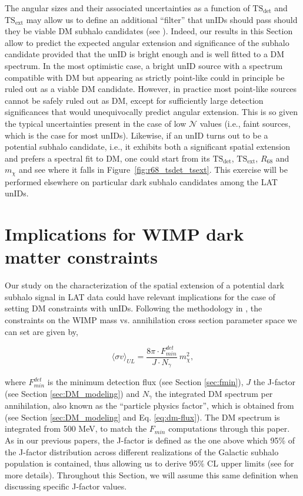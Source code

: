 \documentclass[%
 reprint,
nofootinbib,
 amsmath,amssymb,
 aps,
]{revtex4-2}
\begin{document}
The angular sizes and their associated uncertainties as a function of $\mathrm{TS_{det}}$ and $\mathrm{TS_{ext}}$ may allow us to define an additional ``filter'' that unIDs should pass should they be viable DM subhalo candidates (see ). Indeed, our results in this Section allow to predict the expected angular extension and significance of the subhalo candidate provided that the unID is bright enough and is well fitted to a DM spectrum. In the most optimistic case, a bright unID source with a spectrum compatible with DM but appearing as strictly point-like could in principle be ruled out as a viable DM candidate. However, in practice most point-like sources cannot be safely ruled out as DM, except for sufficiently large detection significances that would unequivocally predict angular extension. This is so given the typical uncertainties present in the case of low $\mathcal{N}$ values (i.e., faint sources, which is the case for most unIDs). Likewise, if an unID turns out to be a potential subhalo candidate, i.e., it exhibits both a significant spatial extension and prefers a spectral fit to DM, one could start from its $\mathrm{TS_{det}}$, $\mathrm{TS_{ext}}$, $R_{68}$ and $m_{\chi}$ and see where it falls in Figure~\ref{fig:r68_tsdet_tsext}. This exercise will be performed elsewhere on particular dark subhalo candidates among the LAT unIDs.



\section{Implications for WIMP dark matter constraints}
\label{sec:implications}
Our study on the characterization of the spatial extension of a potential dark subhalo signal in LAT data could have relevant implications for the case of setting DM constraints with unIDs. Following the methodology in , the constraints on the WIMP mass vs. annihilation cross section parameter space we can set are given by,

\begin{equation}
\label{eq:master_formula}
\langle\sigma v\rangle_{UL}=\frac{8\pi\cdot F_{min}^{det}}{J\cdot N_{\gamma}}~m_{\chi}^2,
\end{equation}

\noindent where $F_{min}^{det}$ is the minimum detection flux (see Section \ref{sec:fmin}), $J$ the J-factor (see Section \ref{sec:DM_modeling}) and $N_{\gamma}$ the integrated DM spectrum per annihilation, also known as the ``particle physics factor'', which is obtained from \cite{Cirelli2011} (see Section \ref{sec:DM_modeling} and Eq. \ref{eq:dm-flux}). The DM spectrum is integrated from 500 MeV, to match the $F_{min}$ computations through this paper. As in our previous papers, the J-factor is defined as the one above which 95\% of the J-factor distribution across different realizations of the Galactic subhalo population is contained, thus allowing us to derive 95\% CL upper limits (see  for more details). Throughout this Section, we will assume this same definition when discussing specific J-factor values.
\end{document}
